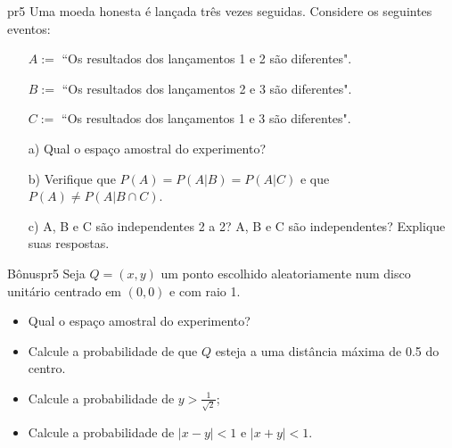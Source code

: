 \begin{problema}{}{pr5}
Uma moeda honesta é lançada três vezes seguidas. Considere os seguintes eventos:
\begin{itemize}
	\item[$A :=$] ``Os resultados dos lançamentos 1 e 2 são diferentes".
	\item[$B :=$] ``Os resultados dos lançamentos 2 e 3 são diferentes".
	\item[$C :=$] ``Os resultados dos lançamentos 1 e 3 são diferentes".
\end{itemize}

\begin{enumerate}
	\item[a)] Qual o espaço amostral do experimento?
	\item[b)] Verifique que $P(A) = P(A | B) = P(A | C)$ e que $P(A) \neq P(A | B \cap C)$.
	\item[c)] A, B e C são independentes 2 a 2? A, B e C são independentes? Explique suas respostas.
\end{enumerate}
\end{problema}




\begin{problema}{Bônus}{pr5}
Seja $Q = (x, y)$ um ponto escolhido aleatoriamente num disco unitário centrado em $(0,0)$ e com raio 1. 

\begin{itemize}
	\item Qual o espaço amostral do experimento?
	\item Calcule a probabilidade de que $Q$ esteja a uma distância máxima de 0.5 do centro.
	\item Calcule a probabilidade de $y > \frac{1}{\sqrt{2}}$;
	\item Calcule a probabilidade de $|x - y| < 1$ e $|x + y| < 1$.
\end{itemize}
\end{problema}

\bigskip
\centering {\scshape\bf\textcolor{darkred}{BOA PROVA}}

%




